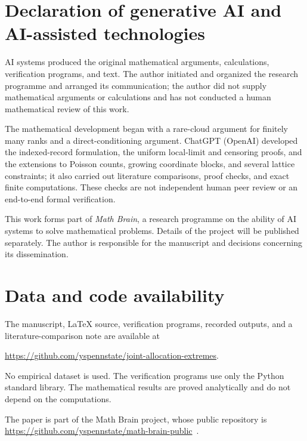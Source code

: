\section*{Declaration of generative AI and AI-assisted technologies}
AI systems produced the original mathematical arguments, calculations, verification programs, and text. The author initiated and organized the research programme and arranged its communication; the author did not supply mathematical arguments or calculations and has not conducted a human mathematical review of this work.

The mathematical development began with a rare-cloud argument for finitely many ranks and a direct-conditioning argument. ChatGPT (OpenAI) developed the indexed-record formulation, the uniform local-limit and censoring proofs, and the extensions to Poisson counts, growing coordinate blocks, and several lattice constraints; it also carried out literature comparisons, proof checks, and exact finite computations. These checks are not independent human peer review or an end-to-end formal verification.

This work forms part of \emph{Math Brain}, a research programme on the ability of AI systems to solve mathematical problems. Details of the project will be published separately. The author is responsible for the manuscript and decisions concerning its dissemination.

\section*{Data and code availability}
The manuscript, \LaTeX{} source, verification programs, recorded outputs, and a literature-comparison note are available at
\begin{center}
\url{https://github.com/yspennstate/joint-allocation-extremes}.
\end{center}
No empirical dataset is used. The verification programs use only the Python standard library. The mathematical results are proved analytically and do not depend on the computations.

The paper is part of the Math Brain project, whose public repository is \url{https://github.com/yspennstate/math-brain-public}~\cite{MathBrainRepo}.

